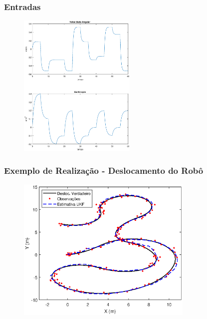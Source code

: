 \documentclass{beamer}
\renewcommand{\(}{\left(}
\renewcommand{\)}{\right)}
\renewcommand{\[}{\left[}
\renewcommand{\]}{\right]}
\begin{document}
\begin{frame}
\frametitle{Entradas}

	\begin{figure}
		\centering
		\includegraphics[width=0.5\textwidth]{images/entradas.eps}
	\end{figure}

\end{frame}

\begin{frame}
\frametitle{Exemplo de Realização - Deslocamento do Robô}

\begin{figure}
	\centering
	\includegraphics[width=0.75\textwidth]{images/exemplo_03_30db_desloc.eps}
\end{figure}

\end{frame}

\end{document}
